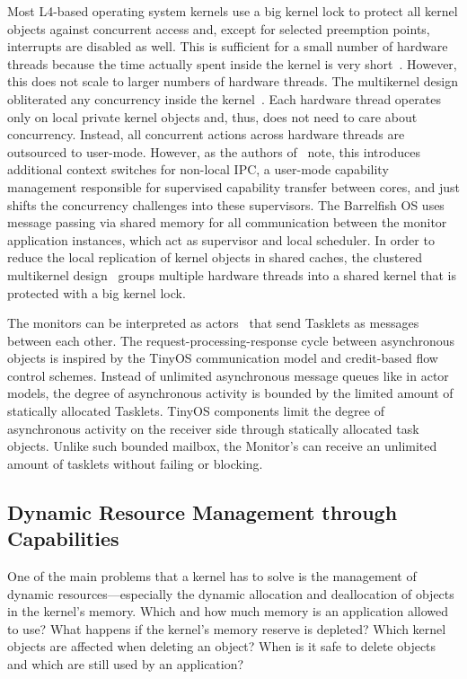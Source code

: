 Most L4-based operating system kernels use a big kernel lock to protect all kernel objects against concurrent access and, except for selected preemption points, interrupts are disabled as well. This is sufficient for a small number of hardware threads because the time actually spent inside the kernel is very short~\cite{Heiser:2016:LML:2912578.2893177}. 
However, this does not scale to larger numbers of hardware threads. The multikernel design obliterated any concurrency inside the kernel~\cite{BAU09}. Each hardware thread operates only on local private kernel objects and, thus, does not need to care about concurrency. Instead, all concurrent actions across hardware threads are outsourced to user-mode. However, as the authors of~\cite{BAU09} note, this introduces additional context switches for non-local IPC, a user-mode capability management responsible for supervised capability transfer between cores, and just shifts the concurrency challenges into these supervisors. The Barrelfish OS uses message passing via shared memory for all communication between the monitor application instances, which act as supervisor and local scheduler. 
In order to reduce the local replication of kernel objects in shared caches, the clustered multikernel design~\cite{vonTessin_12} groups multiple hardware threads into a shared kernel that is protected with a big kernel lock.

\hspace{0px}
The monitors can be interpreted as actors~\cite{Hewitt:1973:UMA:1624775.1624804} that send Tasklets as messages between each other. The request-processing-response cycle between asynchronous objects is inspired by the TinyOS communication model and credit-based flow control schemes.  Instead of unlimited asynchronous message queues like in actor models, the degree of asynchronous activity is bounded by the limited amount of statically allocated Tasklets. TinyOS components limit the degree of asynchronous activity on the receiver side through statically allocated task objects. Unlike such bounded mailbox, the \mythos Monitor's can receive an unlimited amount of tasklets without failing or blocking.

\subsection{Dynamic Resource Management through Capabilities}
\label{sec:log:capabilities}

One of the main problems that a kernel has to solve is the management of dynamic resources---especially the dynamic allocation and deallocation of objects in the kernel's memory. Which and how much memory is an application allowed to use? What happens if the kernel's memory reserve is depleted? Which kernel objects are affected when deleting an object? When is it safe to delete objects and which are still used by an application?

